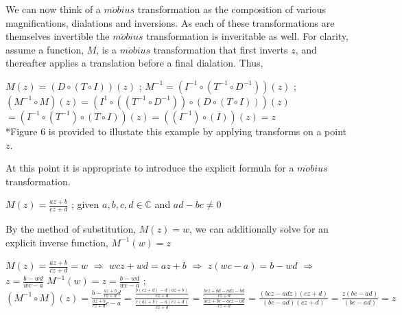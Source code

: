 \documentclass[a4paper,man,natbib]{apa6}
\newcommand{\C}{\mathbb{C}}  %
\begin{document}
We can now think of a $ m\ddot{o}bius $ transformation as the composition of various magnifications, dialations and inversions. 
As each of these transformations are themselves invertible the $ m\ddot{o}bius $ transformation is inveritable as well. For clarity, assume a function, $ M $,
is a $ m\ddot{o}bius $ transformation that first inverts $ z $, and thereafter applies a translation before a final dialation. Thus,

\begin{center}

      $ M(z) = (D \circ (T \circ I))(z) $ ; $ M^{-1} = (I^{-1} \circ (T^{-1} \circ D^{-1}))(z) $ ; \\
      $ (M^{-1} \circ M)(z) = (I^{1} \circ ((T^{-1} \circ D^{-1})) \circ (D \circ (T \circ I)))(z) $ \\ 
      $ = (I^{-1} \circ (T^{-1}) \circ (T \circ I))(z) = ((I^{-1}) \circ (I))(z) = z $ \\
      *Figure 6 is provided to illustate this example by applying transforms on a point $ z $.

\end{center}

At this point it is appropriate to introduce the explicit formula for a $ m\ddot{o}bius $ transformation.

\begin{center}

      $ M(z) = \frac{az + b}{cz + d} $ ; given $ a,b,c,d \in \C $ and $ ad - bc \neq 0 $

\end{center}

By the method of substitution, $ M(z) = w $, we can additionally solve for an explicit inverse function, $ M^{-1}(w) = z $

\begin{center}

      $ M(z) = \frac{az + b}{cz + d} = w $ $ \Rightarrow $ $ wcz + wd = az + b $ $ \Rightarrow $ $ z(wc - a) = b - wd $ $ \Rightarrow $ $ z = \frac{b - wd}{wc - a} $
      $ M^{-1}(w) = z = \frac{b - wd}{wc - a} $ ; $ (M^{-1} \circ M)(z) = \frac{b - \frac{az + b}{cz + d}d}{\frac{az + b}{cz + d}c - a} 
      = \frac{\frac{b(cz + d) - d(az + b)}{cz + d}}{\frac{c(az + b) - a(cz + d)}{cz + d}} = \frac{\frac{bcz + bd - adz - bd}{cz + d}}{\frac{acz + bc - acz - ad}{cz + d}} 
      = \frac{(bcz - adz)(cz +d)}{(bc - ad)(cz + d)} = \frac{z(bc - ad)}{(bc - ad)} = z $ 

\end{center}
\end{document}
